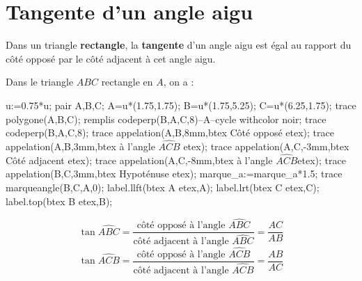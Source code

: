 \section{Tangente d'un angle aigu}
\begin{definition}
    Dans un triangle {\bfseries rectangle}, la \textbf{tangente} d'un angle aigu est égal au rapport du côté opposé  par le côté adjacent à cet angle aigu.
\end{definition}

\begin{exemples*1}
    Dans le triangle $ABC$ rectangle en $A$, on a : 
    
    \medskip
    \begin{minipage}{0.4\linewidth}
        \begin{Geometrie}[CoinHD={(5u,4.5u)}]
            u:=0.75*u;            
            pair A,B,C;
            A=u*(1.75,1.75);
            B=u*(1.75,5.25);
            C=u*(6.25,1.75);
            trace polygone(A,B,C);
            remplis codeperp(B,A,C,8)--A--cycle withcolor noir;
            trace codeperp(B,A,C,8);
            trace appelation(A,B,8mm,btex Côté opposé etex);
            trace appelation(A,B,3mm,btex à l'angle $\widehat{ACB}$ etex);
            trace appelation(A,C,-3mm,btex Côté adjacent etex);
            trace appelation(A,C,-8mm,btex à l'angle $\widehat{ACB}$etex);
            trace appelation(B,C,3mm,btex Hypoténuse etex);
            marque_a:=marque_a*1.5;    
            trace marqueangle(B,C,A,0);
            label.llft(btex A etex,A);
            label.lrt(btex C etex,C);
            label.top(btex B etex,B);
        \end{Geometrie}
    \end{minipage}
    \begin{minipage}{0.55\linewidth}        
        $$\tan\widehat{ABC}=\frac{\mbox{côté opposé à l'angle $\widehat{ABC}$}}{\mbox{côté adjacent à l'angle $\widehat{ABC}$}}=\frac{AC}{AB}$$
        $$\tan\widehat{ACB}=\frac{\mbox{côté opposé à l'angle $\widehat{ACB}$}}{\mbox{côté adjacent à l'angle $\widehat{ACB}$}}=\frac{AB}{AC}$$
    \end{minipage}
\end{exemples*1}

